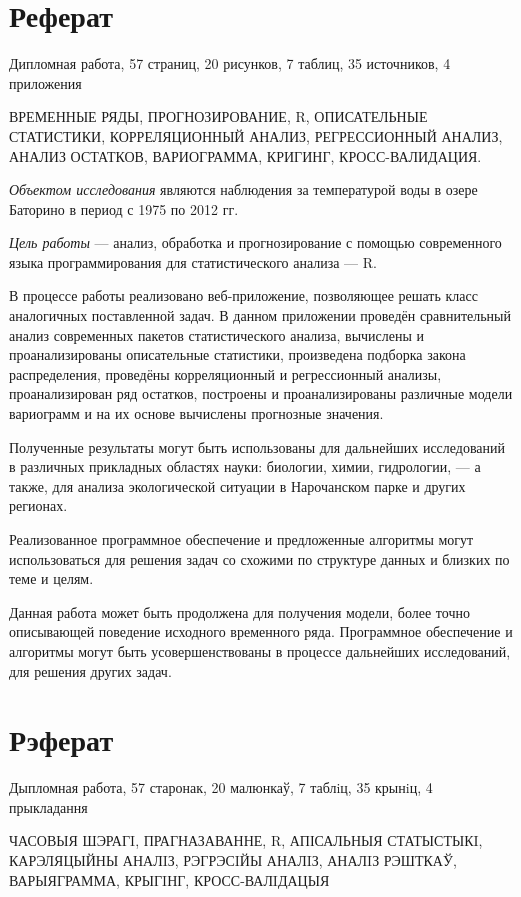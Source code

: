 \newpage

\chapter*{Реферат}
Дипломная работа, 57 страниц, 20 рисунков, 7 таблиц, 35 источников, 4 приложения

ВРЕМЕННЫЕ РЯДЫ, ПРОГНОЗИРОВАНИЕ, R, ОПИСАТЕЛЬНЫЕ СТАТИСТИКИ, КОРРЕЛЯЦИОННЫЙ АНАЛИЗ, РЕГРЕССИОННЫЙ АНАЛИЗ, АНАЛИЗ ОСТАТКОВ, ВАРИОГРАММА, КРИГИНГ, КРОСС-ВАЛИДАЦИЯ.

\textit{Объектом исследования} являются наблюдения за температурой воды в озере Баторино в период с 1975 по 2012 гг.

\textit{Цель работы} --- анализ, обработка и прогнозирование с помощью современного языка программирования для статистического анализа --- R.

В процессе работы реализовано веб-приложение, позволяющее решать класс аналогичных поставленной задач. В данном приложении проведён сравнительный анализ современных пакетов статистического анализа, вычислены и проанализированы описательные статистики, произведена подборка закона распределения, проведёны корреляционный и регрессионный анализы, проанализирован ряд остатков, построены и проанализированы различные модели вариограмм и на их основе вычислены прогнозные значения.

Полученные результаты могут быть использованы для дальнейших исследований в различных прикладных областях науки: биологии, химии, гидрологии, --- а также, для анализа экологической ситуации в Нарочанском парке и других регионах.

Реализованное программное обеспечение и предложенные алгоритмы могут использоваться для решения задач со схожими по структуре данных и близких по теме и целям.

Данная работа может быть продолжена для получения модели, более точно описывающей поведение исходного временного ряда. Программное обеспечение и алгоритмы могут быть усовершенствованы в процессе дальнейших исследований, для решения других задач.

\newpage

\chapter*{Рэферат}
Дыпломная работа, 57 старонак, 20 малюнкаў, 7 таблiц, 35 крынiц, 4 прыкладання

ЧАСОВЫЯ ШЭРАГI, ПРАГНАЗАВАННЕ, R, АПІСАЛЬНЫЯ СТАТЫСТЫКI, КАРЭЛЯЦЫЙНЫ АНАЛIЗ, РЭГРЭСIЙЫ АНАЛIЗ, АНАЛIЗ РЭШТКАЎ, ВАРЫЯГРАММА, КРЫГIНГ, КРОСС-ВАЛIДАЦЫЯ

